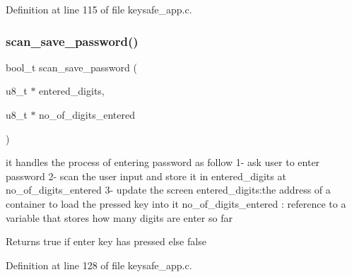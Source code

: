 Definition at line 115 of file keysafe\+\_\+app.\+c.

\mbox{\label{keysafe__app_8c_ac8f015eb390f0a09e1b2432ca633971a}} 
\subsubsection{scan\+\_\+save\+\_\+password()}
{\footnotesize\ttfamily bool\+\_\+t scan\+\_\+save\+\_\+password (\begin{DoxyParamCaption}\item[{u8\+\_\+t $\ast$}]{entered\+\_\+digits,  }\item[{u8\+\_\+t $\ast$}]{no\+\_\+of\+\_\+digits\+\_\+entered }\end{DoxyParamCaption})}



it handles the process of entering password as follow 1-\/ ask user to enter password 2-\/ scan the user input and store it in entered\+\_\+digits at no\+\_\+of\+\_\+digits\+\_\+entered 3-\/ update the screen  entered\+\_\+digits\+:the address of a container to load the pressed key into it  no\+\_\+of\+\_\+digits\+\_\+entered \+: reference to a variable that stores how many digits are enter so far 

\begin{DoxyReturn}{Returns}
true if enter key has pressed else false 
\end{DoxyReturn}


Definition at line 128 of file keysafe\+\_\+app.\+c.

